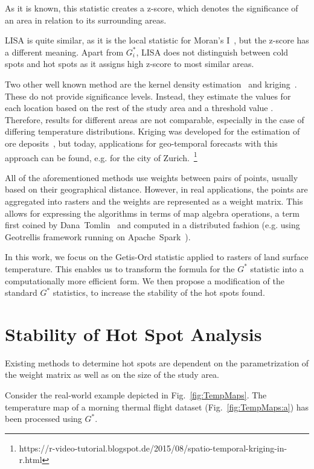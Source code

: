 \documentclass{itatnew}
\begin{document}
As it is known, this statistic creates a z-score, which denotes the significance
of an area in relation to its surrounding areas.

LISA is quite similar, as it is the local statistic for Moran's
I~\cite{Anselin.1995}, but the z-score has a different meaning. Apart from
$G^*_i$, LISA does not distinguish between cold spots and hot spots as it
assigns high z-score to most similar areas.

Two other well known method are the kernel density estimation~\cite{KDE_Hotspot}
and kriging~\cite{Kriging_Hotspot}. These do not provide significance levels.
Instead, they estimate the values for each location based on the rest of the
study area and a threshold value \cite{Thakali2015}. Therefore, results for
different areas are not comparable, especially in the case of differing
temperature distributions. Kriging was developed for the estimation of ore
deposits~\cite{krige1951statistical}, but today, applications for geo-temporal
forecasts with this approach can be found, e.g. for the city of
Zurich.~\footnote{https://r-video-tutorial.blogspot.de/2015/08/spatio-temporal-kriging-in-r.html}

All of the aforementioned methods use weights between pairs of points, usually
based on their geographical distance. However, in real applications, the points
are aggregated into rasters and the weights are represented as a weight matrix.
This allows for expressing the algorithms in terms of map algebra operations, a
term first coined by Dana~Tomlin~\cite{Tomlin1990} and computed in a distributed
fashion (e.g. using Geotrellis framework running on
Apache~Spark~\cite{github:Geotrellis}).

In this work, we focus on the Getis-Ord statistic applied to rasters of land
surface temperature. This enables us to transform the formula for the $G^*$
statistic into a computationally more efficient form. We then propose a
modification of the standard $G^*$ statistics, to increase the stability of the
hot spots found.

\section{Stability of Hot Spot Analysis}
\label{sec:Metric}

Existing methods to determine hot spots are dependent on the parametrization of
the weight matrix as well as on the size of the study area.

Consider the real-world example depicted in Fig.~\ref{fig:TempMaps}. The
temperature map of a morning thermal flight dataset (Fig.~\ref{fig:TempMaps:a})
has been processed using $G^*$.
\end{document}
